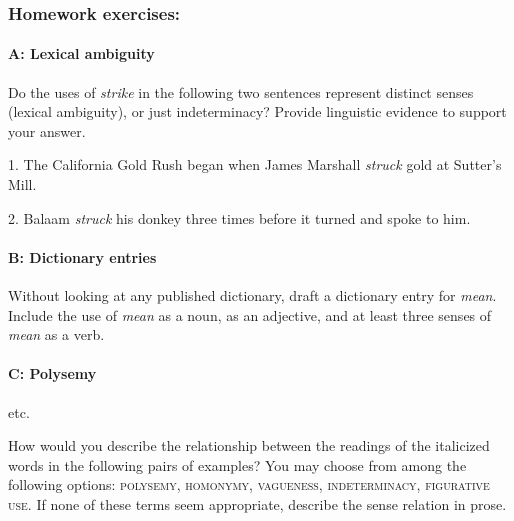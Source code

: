 \subsubsection{Homework exercises:}\label{sec:}
\paragraph{A: Lexical ambiguity}

Do the uses of \textit{strike} in the following two sentences represent distinct senses (lexical ambiguity), or just indeterminacy? Provide linguistic evidence to support your answer.

1. The California Gold Rush began when James Marshall \textit{struck} gold at Sutter’s Mill.

2. Balaam \textit{struck} his donkey three times before it turned and spoke to him.

\paragraph{B: Dictionary entries}

Without looking at any published dictionary, draft a dictionary entry for \textit{mean}. Include the use of \textit{mean} as a noun, as an adjective, and at least three senses of \textit{mean} as a verb.

\paragraph{C: Polysemy}etc.\footnotemark{}

How would you describe the relationship between the readings of the italicized words in the following pairs of examples? You may choose from among the following options: \textsc{polysemy, homonymy, vagueness, indeterminacy, figurative use.} If none of these terms seem appropriate, describe the sense relation in prose.

